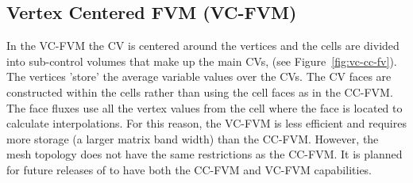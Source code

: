 \subsection{Vertex Centered FVM (VC-FVM)}

In the VC-FVM the CV is centered around the vertices and the cells are
divided into sub-control volumes that make up the main CVs, (see
Figure~\ref{fig:vc-cc-fv}). The vertices 'store' the average variable
values over the CVs. The CV faces are constructed within the cells
rather than using the cell faces as in the CC-FVM. The face fluxes use
all the vertex values from the cell where the face is located to
calculate interpolations. For this reason, the VC-FVM is less
efficient and requires more storage (a larger matrix band width) than
the CC-FVM.  However, the mesh topology does not have the same
restrictions as the CC-FVM. It is planned for future releases of
\FiPy{} to have both the CC-FVM and VC-FVM capabilities.

